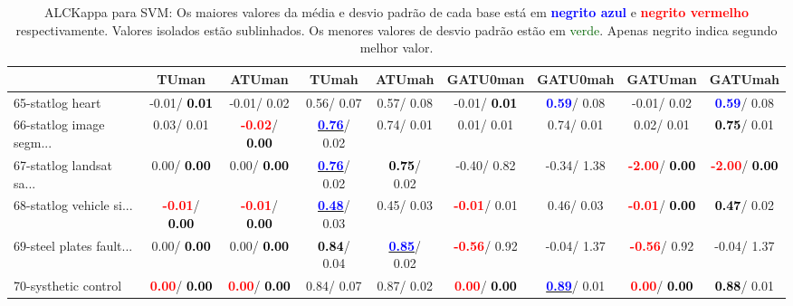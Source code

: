 \begin{table}[h]
\caption{ALCKappa para SVM: Os maiores valores da média e desvio padrão de cada base está em \textcolor{blue}{\textbf{negrito azul}} e \textcolor{red}{\textbf{negrito vermelho}} respectivamente. Valores isolados estão sublinhados. Os menores valores de desvio padrão estão em \textcolor{darkgreen}{verde}. Apenas negrito indica segundo melhor valor.}
\begin{center}\begin{tabular}{lc|c|c|c|c|c|c|c}
 & TUman & \textbf{ATUman} & TUmah & \textbf{ATUmah} & GATU0man & GATU0mah & GATUman & GATUmah\\ \hline 65-statlog heart &  -0.01/\textcolor{black}{\textbf{  0.01}} &  -0.01/  0.02 &   0.56/  0.07 &   0.57/  0.08 &  -0.01/\textcolor{black}{\textbf{  0.01}} & \textcolor{blue}{\textbf{  0.59}}/  0.08 &  -0.01/  0.02 & \textcolor{blue}{\textbf{  0.59}}/  0.08 \\
66-statlog image segm... &   0.03/  0.01 & \textcolor{red}{\textbf{ -0.02}}/\textcolor{black}{\textbf{  0.00}} & \underline{\textcolor{blue}{\textbf{  0.76}}}/  0.02 &   0.74/  0.01 &   0.01/  0.01 &   0.74/  0.01 &   0.02/  0.01 & \textcolor{black}{\textbf{  0.75}}/  0.01 \\
67-statlog landsat sa... &   0.00/\textcolor{black}{\textbf{  0.00}} &   0.00/\textcolor{black}{\textbf{  0.00}} & \underline{\textcolor{blue}{\textbf{  0.76}}}/  0.02 & \textcolor{black}{\textbf{  0.75}}/  0.02 &  -0.40/  0.82 &  -0.34/  1.38 & \textcolor{red}{\textbf{ -2.00}}/\textcolor{black}{\textbf{  0.00}} & \textcolor{red}{\textbf{ -2.00}}/\textcolor{black}{\textbf{  0.00}} \\
68-statlog vehicle si... & \textcolor{red}{\textbf{ -0.01}}/\textcolor{black}{\textbf{  0.00}} & \textcolor{red}{\textbf{ -0.01}}/\textcolor{black}{\textbf{  0.00}} & \underline{\textcolor{blue}{\textbf{  0.48}}}/  0.03 &   0.45/  0.03 & \textcolor{red}{\textbf{ -0.01}}/  0.01 &   0.46/  0.03 & \textcolor{red}{\textbf{ -0.01}}/\textcolor{black}{\textbf{  0.00}} & \textcolor{black}{\textbf{  0.47}}/  0.02 \\
69-steel plates fault... &   0.00/\textcolor{black}{\textbf{  0.00}} &   0.00/\textcolor{black}{\textbf{  0.00}} & \textcolor{black}{\textbf{  0.84}}/  0.04 & \underline{\textcolor{blue}{\textbf{  0.85}}}/  0.02 & \textcolor{red}{\textbf{ -0.56}}/  0.92 &  -0.04/  1.37 & \textcolor{red}{\textbf{ -0.56}}/  0.92 &  -0.04/  1.37 \\
70-systhetic control & \textcolor{red}{\textbf{  0.00}}/\textcolor{black}{\textbf{  0.00}} & \textcolor{red}{\textbf{  0.00}}/\textcolor{black}{\textbf{  0.00}} &   0.84/  0.07 &   0.87/  0.02 & \textcolor{red}{\textbf{  0.00}}/\textcolor{black}{\textbf{  0.00}} & \underline{\textcolor{blue}{\textbf{  0.89}}}/  0.01 & \textcolor{red}{\textbf{  0.00}}/\textcolor{black}{\textbf{  0.00}} & \textcolor{black}{\textbf{  0.88}}/  0.01 \\

\end{tabular}
\end{center}
\end{table}
